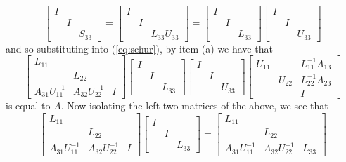 \documentclass{../kin_math}
\begin{document}
\begin{questions}
\begin{enumerate}
\begin{solution}
\begin{equation*}
        \begin{bmatrix} I & & \\ & I & \\ & & S_{33} \end{bmatrix} = \begin{bmatrix} I & & \\ & I & \\ & & L_{33} U_{33} \end{bmatrix} = \begin{bmatrix} I & & \\ & I & \\ & & L_{33} \end{bmatrix} \begin{bmatrix} I & & \\ & I & \\ & & U_{33} \end{bmatrix}
      \end{equation*}
      and so substituting into (\ref{eq:schur}), by item (a) we have that
      \begin{equation*}
        \begin{bmatrix} L_{11} & & \\ & L_{22} & \\ A_{31} U_{11}^{-1} & A_{32} U_{22}^{-1} & I \end{bmatrix} \begin{bmatrix} I & & \\ & I & \\ & & L_{33} \end{bmatrix} \begin{bmatrix} I & & \\ & I & \\ & & U_{33} \end{bmatrix} \begin{bmatrix} U_{11} & & L_{11}^{-1} A_{13} \\ & U_{22} & L_{22}^{-1} A_{23} \\ & & I \end{bmatrix}
      \end{equation*}
      is equal to $A$. Now isolating the left two matrices of the above, we see that
      \begin{equation*}
        \begin{bmatrix} L_{11} & & \\ & L_{22} & \\ A_{31} U_{11}^{-1} & A_{32} U_{22}^{-1} & I \end{bmatrix} \begin{bmatrix} I & & \\ & I & \\ & & L_{33} \end{bmatrix} = \begin{bmatrix} L_{11} & & \\ & L_{22} & \\ A_{31} U_{11}^{-1} & A_{32} U_{22}^{-1} & L_{33} \end{bmatrix}

\end{equation*}
\end{solution}
\end{enumerate}
\end{questions}
\end{document}

